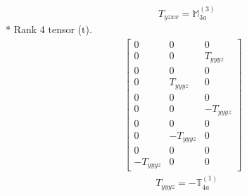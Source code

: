 \documentclass[fleqn,8pt,landscape]{jsarticle}
\begin{document}
\begin{align*}
& T_{yzxx} = \mathbb{M}_{3a}^{(3)}
\end{align*}
* Rank 4 tensor (t).
\begin{align*}
\begin{bmatrix} 0 & 0 & 0 \\ 0 & 0 & T_{yyyz} \\ 0 & 0 & 0 \\ 0 & T_{yyyz} & 0 \\ 0 & 0 & 0 \\ 0 & 0 & - T_{yyyz} \\ 0 & 0 & 0 \\ 0 & - T_{yyyz} & 0 \\ 0 & 0 & 0 \\ - T_{yyyz} & 0 & 0 \end{bmatrix}
\end{align*}
\begin{align*}
& T_{yyyz} = - \mathbb{T}_{4a}^{(1)}
\end{align*}
\end{document}
